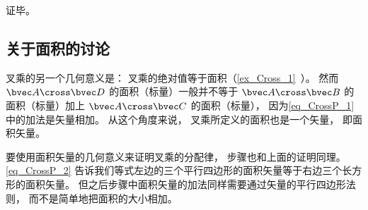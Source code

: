 证毕。

\subsection{关于面积的讨论}
叉乘的另一个几何意义是： 叉乘的绝对值等于面积（\autoref{ex_Cross_1}~）。 然而 $\bvec A \cross \bvec D$ 的面积（标量）一般并不等于 $\bvec A \cross \bvec B$ 的面积（标量）加上 $\bvec A \cross \bvec C$ 的面积（标量）， 因为\autoref{eq_CrossP_1} 中的加法是矢量相加。 从这个角度来说， 叉乘所定义的面积也是一个矢量， 即面积矢量。

要使用面积矢量的几何意义来证明叉乘的分配律， 步骤也和上面的证明同理。 \autoref{eq_CrossP_2} 告诉我们等式左边的三个平行四边形的面积矢量等于右边三个长方形的面积矢量。 但之后步骤中面积矢量的加法同样需要通过矢量的平行四边形法则， 而不是简单地把面积的大小相加。
